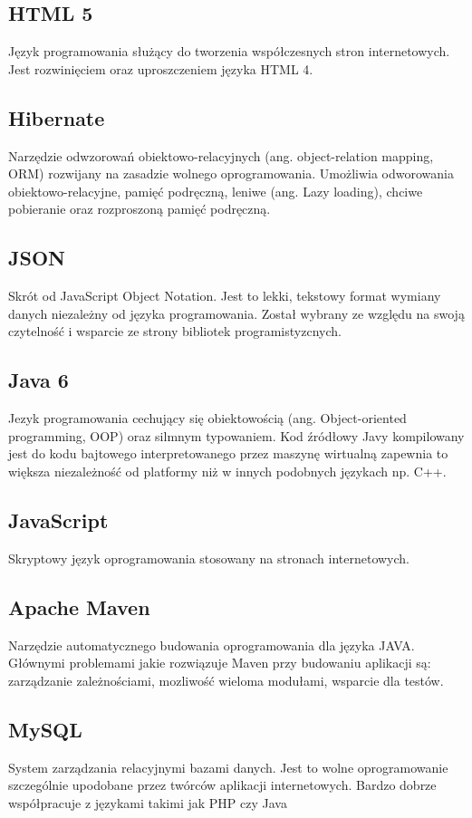 \documentclass[11pt,a4paper,polish,thesis]{dcsbook}
\begin{document}
\subsection{HTML 5}
Język programowania służący do tworzenia współczesnych stron internetowych. Jest rozwinięciem oraz uproszczeniem języka HTML 4.
\subsection{Hibernate}
Narzędzie odwzorowań obiektowo-relacyjnych (ang. object-relation mapping, ORM) rozwijany na zasadzie wolnego oprogramowania. Umożliwia odworowania obiektowo-relacyjne, pamięć podręczną, leniwe (ang. Lazy loading), chciwe pobieranie oraz rozproszoną pamięć podręczną.
\subsection{JSON}
Skrót od JavaScript Object Notation. Jest to lekki, tekstowy format wymiany danych niezależny od języka programowania. Został wybrany ze względu na swoją czytelność i wsparcie ze strony bibliotek programistyzcnych.
\subsection{Java 6}
Jezyk programowania cechujący się obiektowością (ang. Object-oriented programming, OOP) oraz silmnym typowaniem. Kod źródłowy Javy kompilowany jest do kodu bajtowego interpretowanego przez maszynę wirtualną zapewnia to większa niezależność od platformy niż w innych podobnych językach np. C++.
\subsection{JavaScript}
Skryptowy język oprogramowania stosowany na stronach internetowych.
\subsection{Apache Maven}
Narzędzie automatycznego budowania oprogramowania dla języka JAVA. Głównymi problemami jakie rozwiązuje Maven przy budowaniu aplikacji są: zarządzanie zależnościami, mozliwość wieloma modułami, wsparcie dla testów.
\subsection{MySQL}
System zarządzania relacyjnymi bazami danych. Jest to wolne oprogramowanie szczególnie upodobane przez twórców aplikacji internetowych. Bardzo dobrze współpracuje z językami takimi jak PHP czy Java
\end{document}
